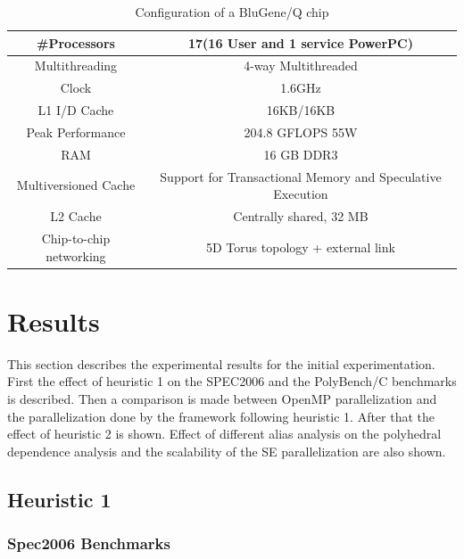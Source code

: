 \documentclass[10pt]{report}          %
\begin{document}
\begin{table}
\centering
\caption{Configuration of a BluGene/Q chip}
\begin{tabular}{|c||c|} \hline
\#Processors&17(16 User and 1 service PowerPC)\\ \hline 
Multithreading&4-way Multithreaded \\ \hline
Clock&1.6GHz \\ \hline
L1 I/D Cache&16KB/16KB \\ \hline
Peak Performance & 204.8 GFLOPS \@ 55W \\ \hline
RAM&16 GB DDR3 \\ \hline
Multiversioned Cache & Support for Transactional Memory and Speculative Execution \\ \hline
L2 Cache & Centrally shared, 32 MB \\ \hline
Chip-to-chip networking & 5D Torus topology + external link \\ \hline
\hline\end{tabular}
\label{table:bgq_config}
\end{table}

\section{Results}
\label{section:results}

This section describes the experimental results for the initial experimentation.  First the effect of heuristic 1 on the SPEC2006 and the PolyBench/C benchmarks is described.  Then a comparison is made between OpenMP parallelization and the parallelization done by the framework following heuristic 1.  After that the effect of heuristic 2 is shown.  Effect of different alias analysis on the polyhedral dependence analysis and the scalability of the SE parallelization are also shown.

\subsection{Heuristic 1}

\subsubsection{Spec2006 Benchmarks}
\end{document}
